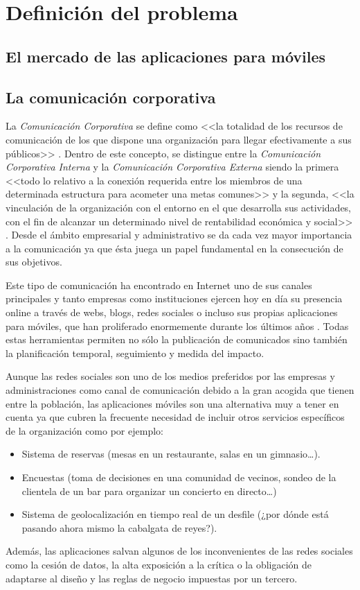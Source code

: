 \chapter{Definición del problema}
\section{El mercado de las aplicaciones para móviles}


\section{La comunicación corporativa}
La \emph{Comunicación Corporativa} se define como <<la totalidad de los recursos de comunicación de los que dispone una organización para llegar efectivamente a sus públicos>> \cite{riel_2001}. Dentro de este concepto, se distingue entre la \emph{Comunicación Corporativa Interna} y la \emph{Comunicación Corporativa Externa} siendo la primera <<todo lo relativo a la conexión requerida entre los miembros de una determinada estructura para acometer una metas comunes>> y la segunda, <<la vinculación de la organización con el entorno en el que desarrolla sus actividades, con el fin de alcanzar un determinado nivel de rentabilidad económica y social>> \cite{castro_2007}. Desde el ámbito empresarial y administrativo se da cada vez mayor importancia a la comunicación ya que ésta juega un papel fundamental en la consecución de sus objetivos.

Este tipo de comunicación ha encontrado en Internet uno de sus canales principales y tanto empresas como instituciones ejercen hoy en día su presencia online a través de webs, blogs, redes sociales o incluso sus propias aplicaciones para móviles, que han proliferado enormemente durante los últimos años \cite{playstore} \cite{appstore}. Todas estas herramientas permiten no sólo la publicación de comunicados sino también la planificación temporal, seguimiento y medida del impacto.

Aunque las redes sociales son uno de los medios preferidos por las empresas \cite{linkedin} y administraciones \cite{grande2015casos} como canal de comunicación debido a la gran acogida que tienen entre la población, las aplicaciones móviles son una alternativa muy a tener en cuenta ya que cubren la frecuente necesidad de incluir otros servicios específicos de la organización como por ejemplo:
\begin{itemize}
    \item Sistema de reservas (mesas en un restaurante, salas en un gimnasio\dots).
    \item Encuestas (toma de decisiones en una comunidad de vecinos, sondeo de la clientela de un bar para organizar un concierto en directo\dots)
    \item Sistema de geolocalización en tiempo real de un desfile (¿por dónde está pasando ahora mismo la cabalgata de reyes?).
\end{itemize}
Además, las aplicaciones salvan algunos de los inconvenientes de las redes sociales como la cesión de datos, la alta exposición a la crítica o la obligación de adaptarse al diseño y las reglas de negocio impuestas por un tercero.